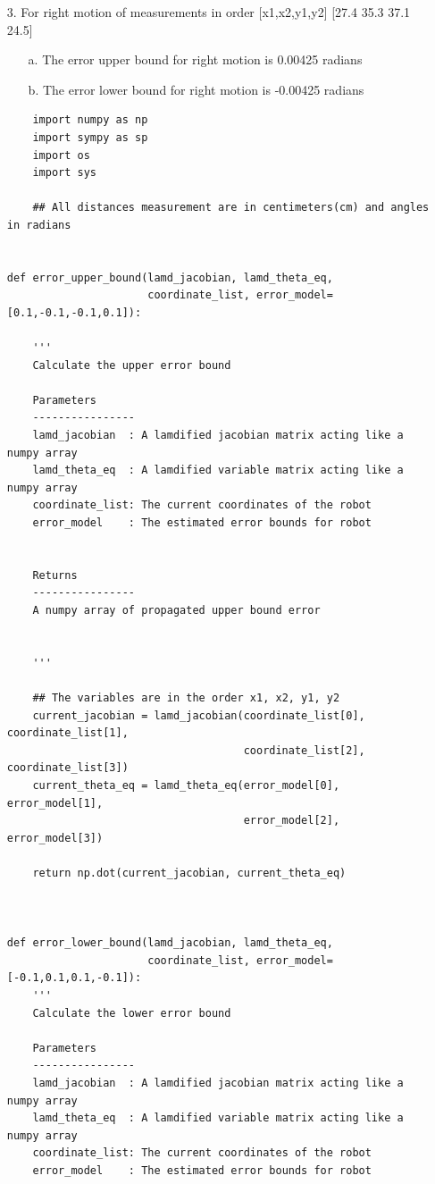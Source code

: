 {\begin{itemize}
        \item[3.] For right motion of measurements in order [x1,x2,y1,y2] [27.4 35.3 37.1 24.5]
        
        \begin{itemize}
            \item[a.] The error upper bound for right motion is 0.00425 radians 
            \item[b.] The error lower bound for right motion is -0.00425 radians
        \end{itemize}


            
        \begin{verbatim}
    import numpy as np
    import sympy as sp
    import os
    import sys
    
    ## All distances measurement are in centimeters(cm) and angles in radians 


def error_upper_bound(lamd_jacobian, lamd_theta_eq, 
                      coordinate_list, error_model=[0.1,-0.1,-0.1,0.1]):
    
    '''
    Calculate the upper error bound
    
    Parameters
    ----------------
    lamd_jacobian  : A lamdified jacobian matrix acting like a numpy array
    lamd_theta_eq  : A lamdified variable matrix acting like a numpy array
    coordinate_list: The current coordinates of the robot
    error_model    : The estimated error bounds for robot
    
    
    Returns
    ----------------
    A numpy array of propagated upper bound error
    
    
    '''
    
    ## The variables are in the order x1, x2, y1, y2
    current_jacobian = lamd_jacobian(coordinate_list[0], coordinate_list[1],
                                     coordinate_list[2], coordinate_list[3])
    current_theta_eq = lamd_theta_eq(error_model[0], error_model[1], 
                                     error_model[2], error_model[3])
    
    return np.dot(current_jacobian, current_theta_eq)
    


def error_lower_bound(lamd_jacobian, lamd_theta_eq, 
                      coordinate_list, error_model=[-0.1,0.1,0.1,-0.1]):
    '''
    Calculate the lower error bound
    
    Parameters
    ----------------
    lamd_jacobian  : A lamdified jacobian matrix acting like a numpy array
    lamd_theta_eq  : A lamdified variable matrix acting like a numpy array
    coordinate_list: The current coordinates of the robot
    error_model    : The estimated error bounds for robot
    

\end{verbatim}
\end{itemize}}
